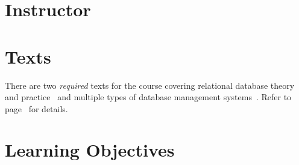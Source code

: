\documentclass[11pt]{article}
\begin{document}

\section{Instructor}



\section{Texts}

There are two \emph{required} texts for the course
covering relational database theory and practice~\cite{harrington}
and multiple types of database management systems~\cite{7db7weeks}.
Refer to page~\pageref{sec:references}
for details.

\section{Learning Objectives}
\end{document}
